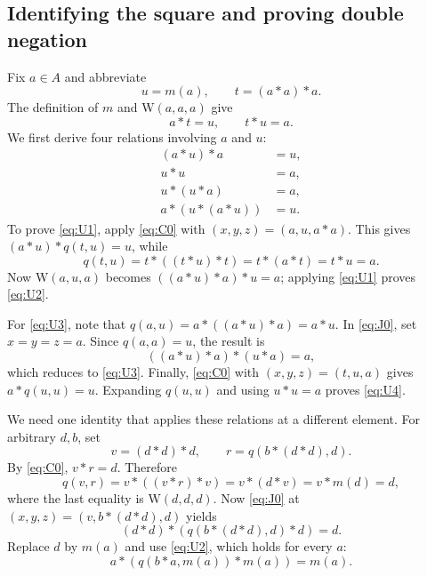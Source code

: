 \documentclass[11pt,a4paper]{article}
\newcommand{\W}{\mathrm{W}}
\begin{document}
\subsection{Identifying the square and proving double negation}
Fix $a\in A$ and abbreviate
\[
 u=m(a),\qquad t=(a*a)*a.
\]
The definition of $m$ and $\W(a,a,a)$ give
\begin{equation}
 a*t=u,\qquad t*u=a.\label{eq:atu}
\end{equation}
We first derive four relations involving $a$ and $u$:
\begin{align}
 (a*u)*a&=u,\tag{$U_1$}\label{eq:U1}\\
 u*u&=a,\tag{$U_2$}\label{eq:U2}\\
 u*(u*a)&=a,\tag{$U_3$}\label{eq:U3}\\
 a*(u*(a*u))&=u.\tag{$U_4$}\label{eq:U4}
\end{align}
To prove \eqref{eq:U1}, apply \eqref{eq:C0} with $(x,y,z)=(a,u,a*a)$.
This gives $(a*u)*q(t,u)=u$, while
\[
 q(t,u)=t*((t*u)*t)=t*(a*t)=t*u=a.
\]
Now $\W(a,u,a)$ becomes $((a*u)*a)*u=a$; applying
\eqref{eq:U1} proves \eqref{eq:U2}.

For \eqref{eq:U3}, note that
$q(a,u)=a*((a*u)*a)=a*u$. In \eqref{eq:J0}, set $x=y=z=a$.
Since $q(a,a)=u$, the result is
\[
 ((a*u)*a)*(u*a)=a,
\]
which reduces to \eqref{eq:U3}. Finally, \eqref{eq:C0} with
$(x,y,z)=(t,u,a)$ gives $a*q(u,u)=u$. Expanding $q(u,u)$ and using
$u*u=a$ proves \eqref{eq:U4}.

We need one identity that applies these relations at a different element.
For arbitrary $d,b$, set
\[
 v=(d*d)*d,\qquad r=q(b*(d*d),d).
\]
By \eqref{eq:C0}, $v*r=d$. Therefore
\[
 q(v,r)=v*((v*r)*v)=v*(d*v)=v*m(d)=d,
\]
where the last equality is $\W(d,d,d)$. Now \eqref{eq:J0} at
$(x,y,z)=(v,b*(d*d),d)$ yields
\[
 (d*d)*(q(b*(d*d),d)*d)=d.
\]
Replace $d$ by $m(a)$ and use \eqref{eq:U2}, which holds for every $a$:
\begin{equation}
 a*(q(b*a,m(a))*m(a))=m(a).\tag{V}\label{eq:V}
\end{equation}
\end{document}

